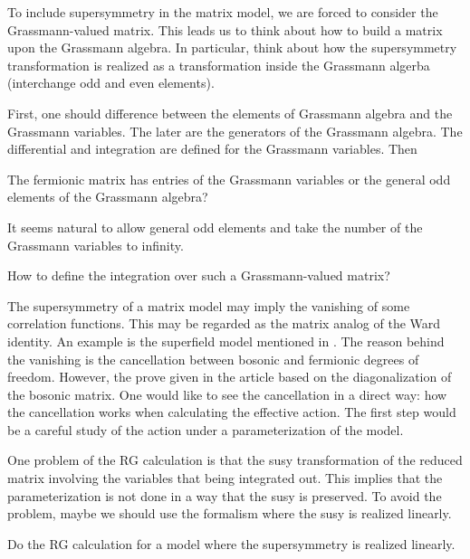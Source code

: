 
To include supersymmetry in the matrix model,
we are forced to consider the Grassmann-valued matrix.
This leads us to think about how to build a matrix upon the Grassmann algebra.
In particular, think about how the supersymmetry transformation is realized as a transformation inside the Grassmann algerba (interchange odd and even elements).

First, one should difference between the elements of Grassmann algebra and the Grassmann variables.
The later are the generators of the Grassmann algebra.
The differential and integration are defined for the Grassmann variables.
Then

\begin{question}
	The fermionic matrix has entries of the Grassmann variables or the general odd elements of the Grassmann algebra?
\end{question}
It seems natural to allow general odd elements and take the number of the Grassmann variables to infinity.
\begin{question}
	How to define the integration over such a Grassmann-valued matrix?
\end{question}

The supersymmetry of a matrix model may imply the vanishing of some correlation functions.
This may be regarded as the matrix analog of the Ward identity.
An example is the superfield model mentioned in
.
The reason behind the vanishing is the cancellation between bosonic and fermionic degrees of freedom.
However, the prove given in the article based on the diagonalization of the bosonic matrix.
One would like to see the cancellation in a direct way:
how the cancellation works when calculating the effective action.
The first step would be a careful study of the action under a parameterization of the model.

One problem of the RG calculation is that
the susy transformation of the reduced matrix involving the variables that being integrated out.
This implies that the parameterization is not done in a way that the susy is preserved.
To avoid the problem, maybe we should use the formalism where the susy is realized linearly.

\begin{idea}
	Do the RG calculation for a model where the supersymmetry is realized linearly.
\end{idea}

